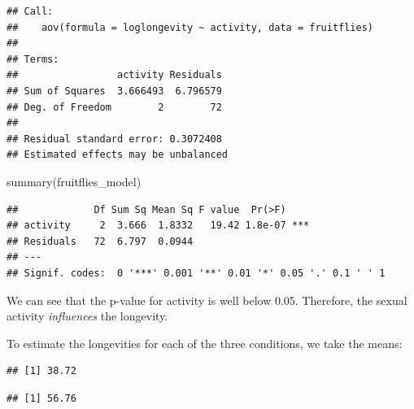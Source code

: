 \documentclass[
]{article}
\newenvironment{Shaded}{\begin{snugshade}}{\end{snugshade}}
\newcommand{\FunctionTok}[1]{\textcolor[rgb]{0.00,0.00,0.00}{#1}}
\newcommand{\NormalTok}[1]{#1}
\newcommand{\SpecialCharTok}[1]{\textcolor[rgb]{0.00,0.00,0.00}{#1}}
\begin{document}
\begin{verbatim}
## Call:
##    aov(formula = loglongevity ~ activity, data = fruitflies)
## 
## Terms:
##                 activity Residuals
## Sum of Squares  3.666493  6.796579
## Deg. of Freedom        2        72
## 
## Residual standard error: 0.3072408
## Estimated effects may be unbalanced
\end{verbatim}

\begin{Shaded}
\begin{Highlighting}[]
\FunctionTok{summary}\NormalTok{(fruitflies\_model)}
\end{Highlighting}
\end{Shaded}

\begin{verbatim}
##             Df Sum Sq Mean Sq F value  Pr(>F)    
## activity     2  3.666  1.8332   19.42 1.8e-07 ***
## Residuals   72  6.797  0.0944                    
## ---
## Signif. codes:  0 '***' 0.001 '**' 0.01 '*' 0.05 '.' 0.1 ' ' 1
\end{verbatim}

We can see that the p-value for activity is well below 0.05. Therefore,
the sexual activity \emph{influences} the longevity.

To estimate the longevities for each of the three conditions, we take
the means:

\begin{Shaded}
\end{Shaded}

\begin{verbatim}
## [1] 38.72
\end{verbatim}

\begin{Shaded}
\end{Shaded}

\begin{verbatim}
## [1] 56.76
\end{verbatim}

\begin{Shaded}
\end{Shaded}
\end{document}
